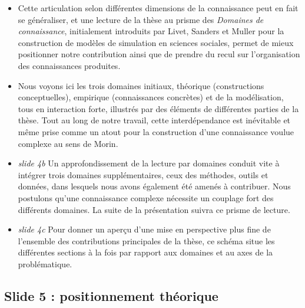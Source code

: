 \documentclass[11pt]{article}
\begin{document}
\begin{itemize}
	\item Cette articulation selon différentes dimensions de la connaissance peut en fait se généraliser, et une lecture de la thèse au prisme des \emph{Domaines de connaissance}, initialement introduits par Livet, Sanders et Muller pour la construction de modèles de simulation en sciences sociales, permet de mieux positionner notre contribution ainsi que de prendre du recul sur l'organisation des connaissances produites.
	\item Nous voyons ici les trois domaines initiaux, théorique (constructions conceptuelles), empirique (connaissances concrètes) et de la modélisation, tous en interaction forte, illustrés par des éléments de différentes parties de la thèse. Tout au long de notre travail, cette interdépendance est inévitable et même prise comme un atout pour la construction d'une connaissance voulue complexe au sens de Morin.
	\item \textit{slide 4b} Un approfondissement de la lecture par domaines conduit vite à intégrer trois domaines supplémentaires, ceux des méthodes, outils et données, dans lesquels nous avons également été amenés à contribuer. Nous postulons qu'une connaissance complexe nécessite un couplage fort des différents domaines. La suite de la présentation suivra ce prisme de lecture.
	\item \textit{slide 4c} Pour donner un aperçu d'une mise en perspective plus fine de l'ensemble des contributions principales de la thèse, ce schéma situe les différentes sections à la fois par rapport aux domaines et au axes de la problématique.
\end{itemize}


\subsection*{Slide 5 : positionnement théorique}
\end{document}
